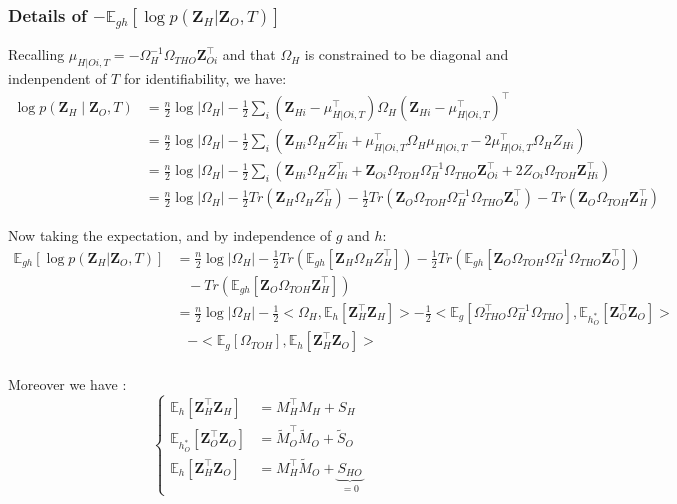 \documentclass[11pt,a4paper]{article}
\newcommand{\Zbf}{\boldsymbol{Z}}
\newcommand{\Esp}{\mathds{E}}
\begin{document}
\subsubsection{Details of  $-\Esp_{gh}[\log p(\Zbf_H | \Zbf_O,T) ]$}
Recalling $\mu_{H|Oi,T} = -\Omega_H^{-1}\Omega_{THO}\Zbf_{Oi} ^\intercal $ and that $\Omega_H$ is constrained to be diagonal and indenpendent of $T$ for identifiability, we have:
\begin{align*}
\log p(\Zbf_H\mid \Zbf_O,T) &= \frac{n}{2} \log |\Omega_H| -\frac{1}{2} \sum_i (\Zbf_{Hi}-\mu_{H|Oi,T}^\intercal )\Omega_H(\Zbf_{Hi}-\mu_{H|Oi,T}^\intercal )^\intercal \\
&= \frac{n}{2} \log |\Omega_H| -\frac{1}{2} \sum_i \left(\Zbf_{Hi}\Omega_HZ_{Hi}^\intercal  + \mu_{H|Oi,T}^\intercal \Omega_H\mu_{H|Oi,T} - 2\mu_{H|Oi,T}^\intercal \Omega_HZ_{Hi} \right)\\
&= \frac{n}{2} \log |\Omega_H| -\frac{1}{2} \sum_i \left(\Zbf_{Hi}\Omega_HZ_{Hi}^\intercal  + \Zbf_{Oi}\Omega_{TOH}\Omega_H^{-1} \Omega_{THO}\Zbf_{Oi}^\intercal + 2Z_{Oi}\Omega_{TOH}\Zbf_{Hi}^\intercal\right)\\
&=\frac{n}{2} \log |\Omega_H| -\frac{1}{2}Tr(\Zbf_H\Omega_HZ_H^\intercal) - \frac{1}{2}Tr(\Zbf_O\Omega_{TOH}\Omega_H^{-1}\Omega_{THO}\Zbf_o^\intercal) - Tr(\Zbf_O\Omega_{TOH}\Zbf_H^\intercal)
\end{align*}


Now taking the expectation, and by independence of $g$ and $h$:
\begin{align*}
\Esp_{gh}[\log p(\Zbf_H | \Zbf_O,T) ] &=\frac{n}{2} \log |\Omega_H| -\frac{1}{2}Tr(\Esp_{gh}[\Zbf_H\Omega_HZ_H^\intercal]) - \frac{1}{2}Tr(\Esp_{gh}[\Zbf_O\Omega_{TOH}\Omega_H^{-1}\Omega_{THO}\Zbf_O^\intercal]) \\
& \;\;\;- Tr(\Esp_{gh}[\Zbf_O\Omega_{TOH}\Zbf_H^\intercal])\\
&=\frac{n}{2} \log |\Omega_H| -\frac{1}{2} <\Omega_H,\Esp_h[\Zbf_H^\intercal \Zbf_H]> -\frac{1}{2} <\Esp_g[\Omega_{THO}^\intercal \Omega_H^{-1}\Omega_{THO}],\Esp_{h_O^*}[\Zbf_O^\intercal \Zbf_O]> \\
&\;\;\; -<\Esp_g[\Omega_{TOH}],\Esp_h[\Zbf_H^\intercal \Zbf_O]>
\end{align*}\\

Moreover we have :
\[\left\{\begin{array}{ll}
\Esp_h[\Zbf_H^\intercal \Zbf_H] &= M_H^\intercal M_H + S_H\\
\Esp_{h_O^*}[\Zbf_O^\intercal \Zbf_O] &= \widetilde{M}_O^\intercal \widetilde{M}_ O + \widetilde{S}_ O\\
\Esp_h[\Zbf_H^\intercal \Zbf_O] &= M_H^\intercal \widetilde{M}_O + \underbrace{S_{HO}}_{=0}
\end{array} \right.\]
\end{document}
